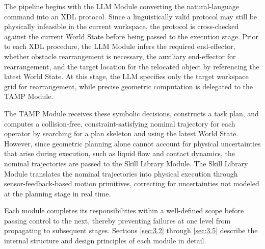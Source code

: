 \documentclass{ieeeaccess}
\begin{document}
The pipeline begins with the LLM Module converting the natural-language command into an XDL protocol. Since a linguistically valid protocol may still be physically infeasible in the current workspace, the protocol is cross-checked against the current World State before being passed to the execution stage. Prior to each XDL procedure, the LLM Module infers the required end-effector, whether obstacle rearrangement is necessary, the auxiliary end-effector for rearrangement, and the target location for the relocated object by referencing the latest World State. At this stage, the LLM specifies only the target workspace grid for rearrangement, while precise geometric computation is delegated to the TAMP Module.

The TAMP Module receives these symbolic decisions, constructs a task plan, and computes a collision-free, constraint-satisfying nominal trajectory for each operator by searching for a plan skeleton and using the latest World State. However, since geometric planning alone cannot account for physical uncertainties that arise during execution, such as liquid flow and contact dynamics, the nominal trajectories are passed to the Skill Library Module. The Skill Library Module translates the nominal trajectories into physical execution through sensor-feedback-based motion primitives, correcting for uncertainties not modeled at the planning stage in real time.

Each module completes its responsibilities within a well-defined scope before passing control to the next, thereby preventing failures at one level from propagating to subsequent stages. Sections \ref{sec:3.2} through \ref{sec:3.5} describe the internal structure and design principles of each module in detail.
\end{document}
